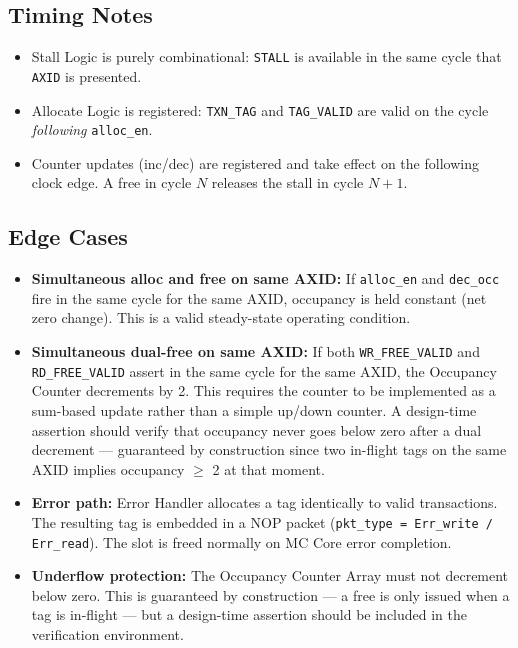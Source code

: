 \subsection{Timing Notes}

\begin{itemize}
  \item Stall Logic is purely combinational: \texttt{STALL} is available
        in the same cycle that \texttt{AXID} is presented.
  \item Allocate Logic is registered: \texttt{TXN\_TAG} and
        \texttt{TAG\_VALID} are valid on the cycle \emph{following}
        \texttt{alloc\_en}.
  \item Counter updates (inc/dec) are registered and take effect on the
        following clock edge. A free in cycle $N$ releases the stall in
        cycle $N{+}1$.
\end{itemize}

\subsection{Edge Cases}

\begin{itemize}
  \item \textbf{Simultaneous alloc and free on same AXID:} If
        \texttt{alloc\_en} and \texttt{dec\_occ} fire in the same cycle
        for the same AXID, occupancy is held constant (net zero change).
        This is a valid steady-state operating condition.
  \item \textbf{Simultaneous dual-free on same AXID:} If both
        \texttt{WR\_FREE\_VALID} and \texttt{RD\_FREE\_VALID} assert in
        the same cycle for the same AXID, the Occupancy Counter
        decrements by 2. This requires the counter to be implemented as
        a sum-based update rather than a simple up/down counter.
        A design-time assertion should verify that occupancy never goes
        below zero after a dual decrement — guaranteed by construction
        since two in-flight tags on the same AXID implies occupancy
        $\geq$ 2 at that moment.
  \item \textbf{Error path:} Error Handler allocates a tag identically
        to valid transactions. The resulting tag is embedded in a NOP
        packet (\texttt{pkt\_type = Err\_write / Err\_read}). The slot
        is freed normally on MC Core error completion.
  \item \textbf{Underflow protection:} The Occupancy Counter Array must
        not decrement below zero. This is guaranteed by construction —
        a free is only issued when a tag is in-flight — but a
        design-time assertion should be included in the verification
        environment.
\end{itemize}